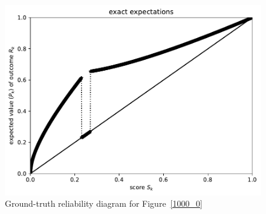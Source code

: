 \documentclass{article}
\begin{document}
\begin{figure}
\begin{centering}

\parbox{\imsize}{\includegraphics[width=\imsize]
                {./codes/unweighted/1000_10_1_2/exact.pdf}}

\end{centering}
\caption{Ground-truth reliability diagram for Figure~\ref{1000_0}}
\label{1000_0e}
\end{figure}
\end{document}
